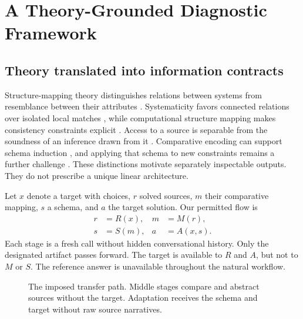 \section{A Theory-Grounded Diagnostic Framework}
\label{sec:framework}
\subsection{Theory translated into information contracts}
Structure-mapping theory distinguishes relations between systems from resemblance between their attributes \citep{gentner1983structure}. Systematicity favors connected relations over isolated local matches \citep{clement1991systematicity}, while computational structure mapping makes consistency constraints explicit \citep{falkenhainer1989sme}. Access to a source is separable from the soundness of an inference drawn from it \citep{gentner1993roles}. Comparative encoding can support schema induction \citep{gick1983schema,gentner2003learning}, and applying that schema to new constraints remains a further challenge \citep{novick1991math}. These distinctions motivate separately inspectable outputs. They do not prescribe a unique linear architecture.

Let $x$ denote a target with choices, $r$ solved sources, $m$ their comparative mapping, $s$ a schema, and $a$ the target solution. Our permitted flow is
\begin{equation}
\begin{aligned}
r&=R(x), & m&=M(r),\\
s&=S(m), & a&=A(x,s).
\end{aligned}
\label{eq:flow}
\end{equation}
Each stage is a fresh call without hidden conversational history. Only the designated artifact passes forward. The target is available to $R$ and $A$, but not to $M$ or $S$. The reference answer is unavailable throughout the natural workflow.

\begin{figure}[t]
\centering
{}
\caption{The imposed transfer path. Middle stages compare and abstract sources without the target. Adaptation receives the schema and target without raw source narratives.}
\label{fig:framework}
\end{figure}

